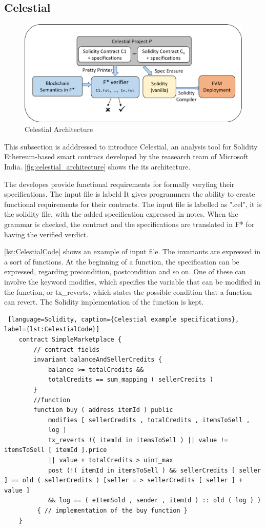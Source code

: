 \subsection{Celestial}
\label{sec:Specification:Celestial}
\begin{figure}
    \centering
    \includegraphics[width=13cm]{logos/CelestialArchitecture.png}
    \caption{Celestial Architecture}
    \label{fig:celestial_architecture}
\end{figure}

This subsection is adddressed to introduce Celestial, 
an analysis tool for Solidity Ethereum-based smart contracs developed by the reasearch team of Microsoft India.
\autoref{fig:celestial_architecture} shows the its architecture. 

The developes provide functional requirements for formally veryfing their specifications. The input file is labeld 
It gives programmers the ability to create functional requirements for their contracts. 
The input file is labelled as ".cel", it is the solidity file, with the added specification expressed in notes. 
When the grammar is checked, the contract and the specifications are translated in F* for having the verified verdict. 

\autoref*{lst:CelestialCode} shows an example of input file. The invariants are expressed in a sort of functions. 
At the beginning of a function, the specification can be expressed, regarding precondition, postcondition and so on. 
One of these can involve the keyword modifies, which specifies the variable that can be modified in the function, or tx\_reverts, 
which states the possible condition that a function can revert. 
The Solidity implementation of the function is kept.
\begin{lstlisting} [language=Solidity, caption={Celestial example specifications}, label={lst:CelestialCode}]
    contract SimpleMarketplace {
        // contract fields
        invariant balanceAndSellerCredits {
            balance >= totalCredits &&
            totalCredits == sum_mapping ( sellerCredits )
        }
        //function 
        function buy ( address itemId ) public
            modifies [ sellerCredits , totalCredits , itemsToSell ,
            log ]
            tx_reverts !( itemId in itemsToSell ) || value != itemsToSell [ itemId ].price
            || value + totalCredits > uint_max
            post (!( itemId in itemsToSell ) && sellerCredits [ seller ] == old ( sellerCredits ) [seller = > sellerCredits [ seller ] + value ]
            && log == ( eItemSold , sender , itemId ) :: old ( log ) )
         { // implementation of the buy function }
    }
\end{lstlisting}

